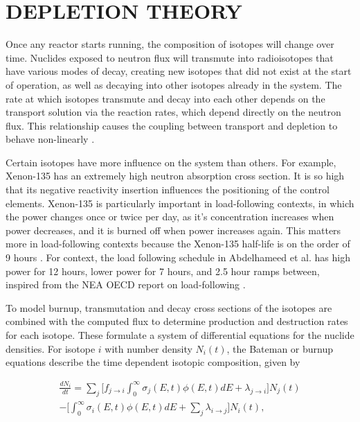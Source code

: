 \documentclass[letterpaper]{physor2024}
\begin{document}
\section{DEPLETION THEORY}\label{sec:depletion}
Once any reactor starts running, the composition of isotopes will change over time. Nuclides exposed to neutron flux will transmute into radioisotopes that have various modes of decay, creating new isotopes that did not exist at the start of operation, as well as decaying into other isotopes already in the system. The rate at which isotopes transmute and decay into each other depends on the transport solution via the reaction rates, which depend directly on the neutron flux. This relationship causes the coupling between transport and depletion to behave non-linearly \cite{romano-depletion-2021}.

Certain isotopes have more influence on the system than others. For example, Xenon-135 has an extremely high neutron absorption cross section. It is so high that its negative reactivity insertion influences the positioning of the control elements. Xenon-135 is particularly important in load-following contexts, in which the power changes once or twice per day, as it's concentration increases when power decreases, and it is burned off when power increases again. This matters more in load-following contexts because the Xenon-135 half-life is on the order of 9 hours \cite{d-and-h}. For context, the load following schedule in Abdelhameed et al. has high power for 12 hours, lower power for 7 hours, and 2.5 hour ramps between, inspired from the NEA OECD report on load-following \cite{Abdelhameed-ANS-2022,nea-oecd-LF}.

To model burnup, transmutation and decay cross sections of the isotopes are combined with the computed flux to determine production and destruction rates for each isotope. These formulate a system of differential equations for the nuclide densities. For isotope $i$ with number density $N_{i}(t)$, the Bateman or burnup equations describe the time dependent isotopic composition, given by

\begin{multline} \label{eq:batemen}
    \frac{dN_{i}}{dt} =
    \sum_{j} \bigg[f_{j\rightarrow{i}}\int_{0}^{\infty} \sigma_{j}(E,t)\phi(E,t)dE + \lambda_{j\rightarrow{i}}\bigg]N_{j}(t) \\
    -\bigg[\int_{0}^{\infty} \sigma_{i}(E,t)\phi(E,t)dE
    +\sum_{j}\lambda_{i\rightarrow{j}}\bigg] N_{i}(t),
\end{multline}
\end{document}

